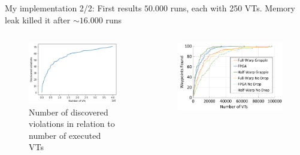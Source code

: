\documentclass[aspectratio=169]{beamer}
\begin{document}
\begin{frame}{My implementation 2/2: First results}
    $50.000$ runs, each with 250 VTs. Memory leak killed it after $\sim 16.000$ runs

    \begin{columns}
        \begin{column}{.5\textwidth}
            \begin{figure}
                \includegraphics[width=\textwidth]{../figures/discovered-states-executed-vts}
                \caption{Number of discovered violations in relation to number of executed VTs}
                \label{fig:discovered-states-executed-vts}
            \end{figure}
        \end{column}
        \begin{column}{.5\textwidth}
            \begin{figure}
                \includegraphics[width=\textwidth]{../figures/paper-discovered-states-executed-vts}

\end{figure}
\end{column}
\end{columns}
\end{frame}
\end{document}
